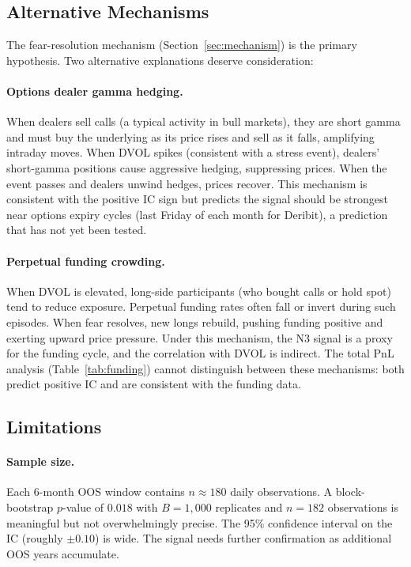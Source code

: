 \documentclass[12pt, a4paper]{article}
\theoremstyle{plain}
\theoremstyle{definition}
\begin{document}
\subsection{Alternative Mechanisms}

The fear-resolution mechanism (Section~\ref{sec:mechanism}) is the primary
hypothesis. Two alternative explanations deserve consideration:

\paragraph{Options dealer gamma hedging.}
When dealers sell calls (a typical activity in bull markets), they are short
gamma and must buy the underlying as its price rises and sell as it falls,
amplifying intraday moves. When DVOL spikes (consistent with a stress event),
dealers' short-gamma positions cause aggressive hedging, suppressing prices.
When the event passes and dealers unwind hedges, prices recover. This
mechanism is consistent with the positive IC sign but predicts the signal
should be strongest near options expiry cycles (last Friday of each month
for Deribit), a prediction that has not yet been tested.

\paragraph{Perpetual funding crowding.}
When DVOL is elevated, long-side participants (who bought calls or hold
spot) tend to reduce exposure. Perpetual funding rates often fall or
invert during such episodes. When fear resolves, new longs rebuild,
pushing funding positive and exerting upward price pressure. Under this
mechanism, the N3 signal is a proxy for the funding cycle, and the
correlation with DVOL is indirect. The total PnL analysis
(Table~\ref{tab:funding}) cannot distinguish between these mechanisms:
both predict positive IC and are consistent with the funding data.

\subsection{Limitations}

\paragraph{Sample size.}
Each 6-month OOS window contains $n \approx 180$ daily observations.
A block-bootstrap $p$-value of $0.018$ with $B = 1{,}000$ replicates
and $n = 182$ observations is meaningful but not overwhelmingly precise.
The 95\% confidence interval on the IC (roughly $\pm 0.10$) is wide.
The signal needs further confirmation as additional OOS years accumulate.
\end{document}
